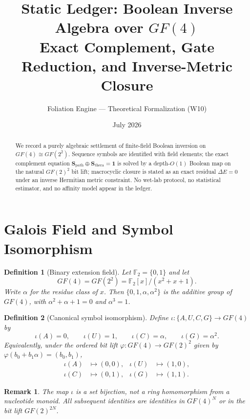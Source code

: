 \documentclass[11pt,a4paper]{article}
\title{\textbf{Static Ledger: Boolean Inverse Algebra over \(GF(4)\)}\\[0.4em]
\large Exact Complement, Gate Reduction, and Inverse-Metric Closure}
\author{Foliation Engine --- Theoretical Formalization (W10)}
\date{July 2026}
\newtheorem{definition}{Definition}
\newtheorem{remark}{Remark}
\begin{document}
\maketitle

\begin{abstract}
We record a purely algebraic settlement of finite-field Boolean inversion on
\(GF(4)\cong GF(2^2)\). Sequence symbols are identified with field elements;
the exact complement equation \(\mathbf{S}_{\mathrm{path}}\oplus\mathbf{S}_{\mathrm{thera}}=\mathbf{1}\)
is solved by a depth-\(O(1)\) Boolean map on the natural \(GF(2)^2\) bit lift;
macrocyclic closure is stated as an exact residual \(\Delta E=0\) under an
inverse Hermitian metric constraint. No wet-lab protocol, no statistical
estimator, and no affinity model appear in the ledger.
\end{abstract}

\section{Galois Field and Symbol Isomorphism}

\begin{definition}[Binary extension field]
Let \(\mathbb{F}_2=\{0,1\}\) and let
\[
  GF(4)=GF(2^2)=\mathbb{F}_2[x]/(x^2+x+1).
\]
Write \(\alpha\) for the residue class of \(x\). Then
\(\{0,1,\alpha,\alpha^2\}\) is the additive group of \(GF(4)\), with
\(\alpha^2+\alpha+1=0\) and \(\alpha^3=1\).
\end{definition}

\begin{definition}[Canonical symbol isomorphism]
Define \(\iota:\{A,U,C,G\}\to GF(4)\) by
\begin{equation}
  \iota(A)=0,\qquad
  \iota(U)=1,\qquad
  \iota(C)=\alpha,\qquad
  \iota(G)=\alpha^2.
\end{equation}
Equivalently, under the ordered bit lift
\(\varphi:GF(4)\to GF(2)^2\) given by
\(\varphi(b_0+b_1\alpha)=(b_0,b_1)\),
\begin{equation}
\begin{aligned}
  \iota(A)&\mapsto(0,0),&
  \iota(U)&\mapsto(1,0),\\
  \iota(C)&\mapsto(0,1),&
  \iota(G)&\mapsto(1,1).
\end{aligned}
\end{equation}
\end{definition}

\begin{remark}
The map \(\iota\) is a set bijection, not a ring homomorphism from a
nucleotide monoid. All subsequent identities are identities in
\(GF(4)^N\) or in the bit lift \(GF(2)^{2N}\).
\end{remark}
\end{document}
